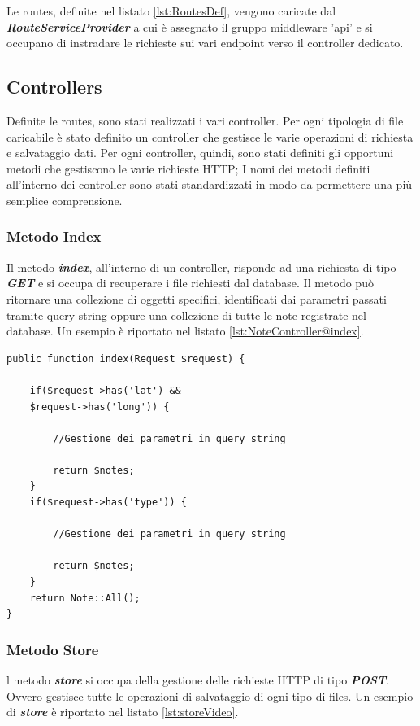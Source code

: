Le routes, definite nel listato \ref{lst:RoutesDef}, vengono caricate dal \textit{\textbf{RouteServiceProvider}} a cui è assegnato il gruppo middleware 'api' e si occupano di instradare le richieste sui vari endpoint verso il controller dedicato.

\subsection{Controllers}

Definite le routes, sono stati realizzati i vari controller. Per ogni tipologia di file caricabile è stato definito un controller che gestisce le varie operazioni di richiesta e salvataggio dati.
Per ogni controller, quindi, sono stati definiti gli opportuni metodi che gestiscono le varie richieste HTTP;
I nomi dei metodi definiti all'interno dei controller sono stati standardizzati in modo da permettere una più semplice comprensione.

\pagebreak
\subsubsection{Metodo Index}
Il metodo \textit{\textbf{index}}, all'interno di un controller, risponde ad una richiesta di tipo \textit{\textbf{GET}} e si occupa di recuperare i file richiesti dal database. Il metodo può ritornare una collezione di oggetti specifici, identificati dai parametri passati tramite query string oppure una collezione di tutte le note registrate nel database. Un esempio è riportato nel listato \ref{lst:NoteController@index}.

\begin{lstlisting}[caption={Funzione \textit{\textbf{index}} del controller NoteController},label={lst:NoteController@index}]
public function index(Request $request) {
	
	if($request->has('lat') &&
	$request->has('long')) {
	
		//Gestione dei parametri in query string
		
		return $notes;
	}
	if($request->has('type')) {

		//Gestione dei parametri in query string	
		
		return $notes;
	}
	return Note::All();
}
\end{lstlisting}

\subsubsection{Metodo Store}
l metodo \textit{\textbf{store}} si occupa della gestione delle richieste HTTP di tipo \textit{\textbf{POST}}. 
Ovvero gestisce tutte le operazioni di salvataggio di ogni tipo di files.
Un esempio di \textit{\textbf{store}} è riportato nel listato \ref{lst:storeVideo}.

